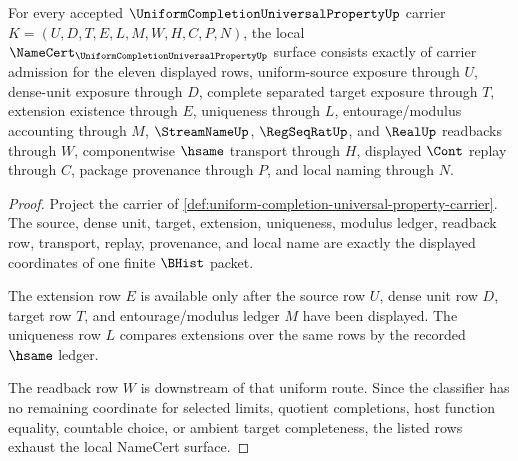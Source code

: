 \begin{theorem}
\label{thm:uniform-completion-universal-property-namecert-obligations}
For every accepted $\UniformCompletionUniversalPropertyUp$ carrier $K=(U,D,T,E,L,M,W,H,C,P,N)$, the local $\NameCert_{\UniformCompletionUniversalPropertyUp}$ surface consists exactly of carrier admission for the eleven displayed rows, uniform-source exposure through $U$, dense-unit exposure through $D$, complete separated target exposure through $T$, extension existence through $E$, uniqueness through $L$, entourage/modulus accounting through $M$, $\StreamNameUp$, $\RegSeqRatUp$, and $\RealUp$ readbacks through $W$, componentwise $\hsame$ transport through $H$, displayed $\Cont$ replay through $C$, package provenance through $P$, and local naming through $N$.
\end{theorem}
\begin{proof}
Project the carrier of \autoref{def:uniform-completion-universal-property-carrier}. The source, dense unit, target, extension, uniqueness, modulus ledger, readback row, transport, replay, provenance, and local name are exactly the displayed coordinates of one finite $\BHist$ packet.

The extension row $E$ is available only after the source row $U$, dense unit row $D$, target row $T$, and entourage/modulus ledger $M$ have been displayed. The uniqueness row $L$ compares extensions over the same rows by the recorded $\hsame$ ledger.

The readback row $W$ is downstream of that uniform route. Since the classifier has no remaining coordinate for selected limits, quotient completions, host function equality, countable choice, or ambient target completeness, the listed rows exhaust the local NameCert surface.
\end{proof}


